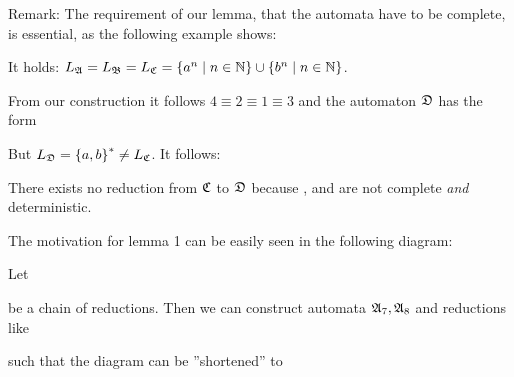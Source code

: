 Remark: The requirement of our lemma, that the automata have to be complete, is
essential, as the following example shows:

\missingfigure

It holds: $\mbox{$L_{\mathfrak{A}}$} = \mbox{$L_{\mathfrak{B}}$} = \mbox{$L_{\mathfrak{C}}$} = \mbox{$\{a^n \mid n \in \mathbb{N}\}$}
\cup \mbox{$\{b^n \mid n \in \mathbb{N}\}$}$.

From our construction it follows $4 \equiv 2 \equiv 1 \equiv 3$ and the
automaton $\mbox{$\mathfrak{D}$}$ has the form

\missingfigure

But $\mbox{$L_{\mathfrak{D}}$} = \mbox{$\{a, b\}$}^* \neq \mbox{$L_{\mathfrak{C}}$}$. It follows:

There exists no reduction from $\mbox{$\mathfrak{C}$}$ to $\mbox{$\mathfrak{D}$}$ because ,  and
 are not complete {\it and} deterministic.

The motivation for lemma 1 can be easily seen in the following diagram:

Let

\begin{center}
\end{center}

be a chain of reductions. Then we can construct automata $\mbox{$\mathfrak{A}$}_7, \mbox{$\mathfrak{A}$}_8$
and reductions like

\begin{center}
\end{center}

such that the diagram can be ''shortened'' to

\begin{center}
\end{center}

